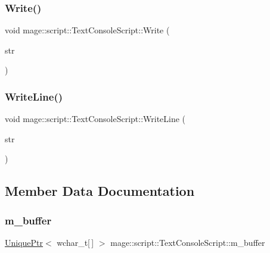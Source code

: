 \subsubsection{\texorpdfstring{Write()}{Write()}}
{\footnotesize\ttfamily void mage\+::script\+::\+Text\+Console\+Script\+::\+Write (\begin{DoxyParamCaption}\item[{\hyperlink{namespacemage_a8769f9d670d6b585ea306cb1062af94b}{Not\+Null}$<$ \hyperlink{namespacemage_ac409e0f2a22292a3a4cd42742994fbf0}{const\+\_\+wzstring} $>$}]{str }\end{DoxyParamCaption})}

\hypertarget{classmage_1_1script_1_1_text_console_script_ac8f0361bc1d703b56f1d8be43a32f0ae}{}\label{classmage_1_1script_1_1_text_console_script_ac8f0361bc1d703b56f1d8be43a32f0ae} 
\subsubsection{\texorpdfstring{Write\+Line()}{WriteLine()}}
{\footnotesize\ttfamily void mage\+::script\+::\+Text\+Console\+Script\+::\+Write\+Line (\begin{DoxyParamCaption}\item[{\hyperlink{namespacemage_a8769f9d670d6b585ea306cb1062af94b}{Not\+Null}$<$ \hyperlink{namespacemage_ac409e0f2a22292a3a4cd42742994fbf0}{const\+\_\+wzstring} $>$}]{str }\end{DoxyParamCaption})}



\subsection{Member Data Documentation}
\hypertarget{classmage_1_1script_1_1_text_console_script_a35db160ce89d4ebf6f184d2fe850beab}{}\label{classmage_1_1script_1_1_text_console_script_a35db160ce89d4ebf6f184d2fe850beab} 
\subsubsection{\texorpdfstring{m\+\_\+buffer}{m\_buffer}}
{\footnotesize\ttfamily \hyperlink{namespacemage_a3316d7143a973e37adf1110f2e80ca31}{Unique\+Ptr}$<$ wchar\+\_\+t\mbox{[}$\,$\mbox{]} $>$ mage\+::script\+::\+Text\+Console\+Script\+::m\+\_\+buffer\hspace{0.3cm}{\ttfamily [private]}}


